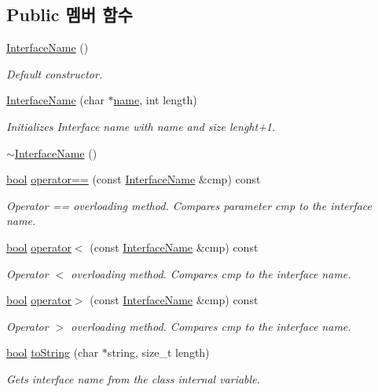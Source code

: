 \subsection*{Public 멤버 함수}
\begin{DoxyCompactItemize}
\item 
\hyperlink{class_interface_name_a47403570dac8bd186bca9248f698a389}{Interface\+Name} ()
\begin{DoxyCompactList}\small\item\em Default constructor. \end{DoxyCompactList}\item 
\hyperlink{class_interface_name_af97e0c69ebffe162f48708ba9944f8fc}{Interface\+Name} (char $\ast$\hyperlink{class_interface_name_a5ac083a645d964373f022d03df4849c8}{name}, int length)
\begin{DoxyCompactList}\small\item\em Initializes Interface name with name and size lenght+1. \end{DoxyCompactList}\item 
\hyperlink{class_interface_name_afc9f83c982ac00a96b690608c325b6e5}{$\sim$\+Interface\+Name} ()
\item 
\hyperlink{avb__gptp_8h_af6a258d8f3ee5206d682d799316314b1}{bool} \hyperlink{class_interface_name_aed0a7ebebbd3e9eff11ba4abef435e88}{operator==} (const \hyperlink{class_interface_name}{Interface\+Name} \&cmp) const 
\begin{DoxyCompactList}\small\item\em Operator \textquotesingle{}==\textquotesingle{} overloading method. Compares parameter cmp to the interface name. \end{DoxyCompactList}\item 
\hyperlink{avb__gptp_8h_af6a258d8f3ee5206d682d799316314b1}{bool} \hyperlink{class_interface_name_a4b103613feae4629193f0002ee5d20fd}{operator$<$} (const \hyperlink{class_interface_name}{Interface\+Name} \&cmp) const 
\begin{DoxyCompactList}\small\item\em Operator \textquotesingle{}$<$\textquotesingle{} overloading method. Compares cmp to the interface name. \end{DoxyCompactList}\item 
\hyperlink{avb__gptp_8h_af6a258d8f3ee5206d682d799316314b1}{bool} \hyperlink{class_interface_name_ad6c60c79de098a6a2c16169ded6d6ce2}{operator$>$} (const \hyperlink{class_interface_name}{Interface\+Name} \&cmp) const 
\begin{DoxyCompactList}\small\item\em Operator \textquotesingle{}$>$\textquotesingle{} overloading method. Compares cmp to the interface name. \end{DoxyCompactList}\item 
\hyperlink{avb__gptp_8h_af6a258d8f3ee5206d682d799316314b1}{bool} \hyperlink{class_interface_name_a92a0be2fe51f7da8a6073637d8b7c518}{to\+String} (char $\ast$string, size\+\_\+t length)
\begin{DoxyCompactList}\small\item\em Gets interface name from the class\textquotesingle{} internal variable. \end{DoxyCompactList}\end{DoxyCompactItemize}
